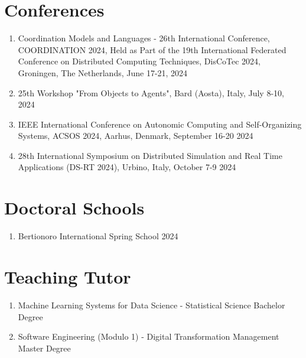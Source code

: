 \documentclass[runningheads]{llncs}
\begin{document}
\section{Conferences}
\begin{enumerate}
    \item Coordination Models and Languages - 26th International Conference, COORDINATION 2024, Held as Part of the 19th International Federated Conference on Distributed Computing Techniques, DisCoTec 2024, Groningen, The Netherlands, June 17-21, 2024
    \item 25th Workshop "From Objects to Agents", Bard (Aosta), Italy, July 8-10, 2024
    \item IEEE International Conference on Autonomic Computing and Self-Organizing Systems, ACSOS 2024, Aarhus, Denmark, September 16-20 2024
    \item 28th International Symposium on Distributed Simulation and Real Time Applications (DS-RT 2024), Urbino, Italy, October 7-9 2024
\end{enumerate}

\section{Doctoral Schools}
\begin{enumerate}
    \item Bertionoro International Spring School 2024
\end{enumerate}

\section{Teaching Tutor}
\begin{enumerate}
    \item Machine Learning Systems for Data Science - Statistical Science Bachelor Degree
    \item Software Engineering (Modulo 1) - Digital Transformation Management Master Degree
\end{enumerate}

%
%
%


%




\end{document}
